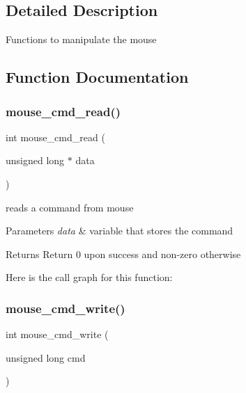 \subsection{Detailed Description}
Functions to manipulate the mouse 

\subsection{Function Documentation}
\hypertarget{group__mouse_ga3a8a668ee784e6662fb1c2fd31e811b0}{}\label{group__mouse_ga3a8a668ee784e6662fb1c2fd31e811b0} 
\subsubsection{\texorpdfstring{mouse\+\_\+cmd\+\_\+read()}{mouse\_cmd\_read()}}
{\footnotesize\ttfamily int mouse\+\_\+cmd\+\_\+read (\begin{DoxyParamCaption}\item[{unsigned long $\ast$}]{data }\end{DoxyParamCaption})}



reads a command from mouse 


\begin{DoxyParams}{Parameters}
{\em data} & variable that stores the command \\
\hline
\end{DoxyParams}
\begin{DoxyReturn}{Returns}
Return 0 upon success and non-\/zero otherwise 
\end{DoxyReturn}
Here is the call graph for this function\+:
\hypertarget{group__mouse_ga42d943d35caacd5219cf4ef665b9bc42}{}\label{group__mouse_ga42d943d35caacd5219cf4ef665b9bc42} 
\subsubsection{\texorpdfstring{mouse\+\_\+cmd\+\_\+write()}{mouse\_cmd\_write()}}
{\footnotesize\ttfamily int mouse\+\_\+cmd\+\_\+write (\begin{DoxyParamCaption}\item[{unsigned long}]{cmd }\end{DoxyParamCaption})}




